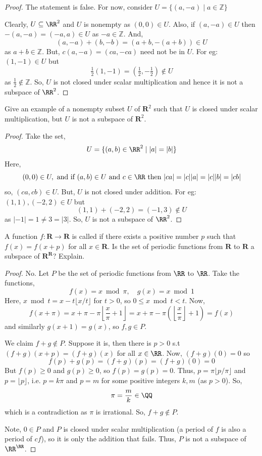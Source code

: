 \begin{proof}
The statement is false. For now, consider $U = \{(a, -a) \mid a \in \mathbb{Z}\}$

Clearly, $U \subseteq \RR^2$ and $U$ is nonempty as $(0,0) \in U$. Also, if $(a,-a) \in U$ then $-(a,-a) = (-a,a) \in U$ as $-a \in \mathbb{Z}$. And,
\[
(a,-a) + (b,-b) = (a+b, -(a+b)) \in U
\]
as $a + b \in \mathbb{Z}$. But, $c(a,-a) = (ca, -ca)$ need not be in $U$. For eg: $(1,-1) \in U$ but
\[
\tfrac{1}{2}(1,-1) = \left(\tfrac{1}{2}, -\tfrac{1}{2}\right) \notin U
\]
as $\tfrac{1}{2} \notin \mathbb{Z}$. So, $U$ is not closed under scalar multiplication and hence it is not a subspace of $\RR^2$.
\end{proof}

\begin{exercise}
Give an example of a nonempty subset $U$ of $\mathbf{R}^2$ such that $U$ is closed under scalar multiplication, but $U$ is not a subspace of $\mathbf{R}^2$.
\end{exercise}

\begin{proof}
Take the set,
\[
U = \{(a,b) \in \RR^2 \mid |a| = |b|\}
\]
Here,
\[
(0,0) \in U, \text{ and if } (a,b) \in U \text{ and } c \in \RR \text{ then } |ca| = |c||a| = |c||b| = |cb|
\]
so, $(ca, cb) \in U$. But, $U$ is not closed under addition. For eg: $(1,1), (-2,2) \in U$ but
\[
(1,1) + (-2,2) = (-1,3) \notin U
\]
as $|-1| = 1 \neq 3 = |3|$. So, $U$ is not a subspace of $\RR^2$.
\end{proof}

\begin{exercise}
A function $f \colon \mathbf{R} \to \mathbf{R}$ is called  if there exists a positive number $p$ such that $f(x) = f(x + p)$ for all $x \in \mathbf{R}$. Is the set of periodic functions from $\mathbf{R}$ to $\mathbf{R}$ a subspace of $\mathbf{R}^{\mathbf{R}}$? Explain.
\end{exercise}

\begin{proof}
No. Let $P$ be the set of periodic functions from $\RR$ to $\RR$. Take the functions,
\[
f(x) = x \bmod \pi, \quad g(x) = x \bmod 1
\]
Here, $x \bmod t = x - t\lfloor x/t \rfloor$ for $t > 0$, so $0 \le x \bmod t < t$. Now,
\[
f(x + \pi) = x + \pi - \pi\left\lfloor \frac{x}{\pi} + 1 \right\rfloor = x + \pi - \pi\left(\left\lfloor \frac{x}{\pi} \right\rfloor + 1\right) = f(x)
\]
and similarly $g(x+1) = g(x)$, so $f, g \in P$.

We claim $f + g \notin P$. Suppose it is, then there is $p > 0$ s.t $(f+g)(x+p) = (f+g)(x)$ for all $x \in \RR$. Now, $(f+g)(0) = 0$ so
\[
f(p) + g(p) = (f+g)(p) = (f+g)(0) = 0
\]
But $f(p) \ge 0$ and $g(p) \ge 0$, so $f(p) = g(p) = 0$. Thus, $p = \pi \lfloor p/\pi \rfloor$ and $p = \lfloor p \rfloor$, i.e. $p = k\pi$ and $p = m$ for some positive integers $k, m$ (as $p > 0$). So,
\[
\pi = \frac{m}{k} \in \QQ
\]
which is a contradiction as $\pi$ is irrational. So, $f + g \notin P$.

Note, $0 \in P$ and $P$ is closed under scalar multiplication (a period of $f$ is also a period of $cf$), so it is only the addition that fails. Thus, $P$ is not a subspace of $\RR^{\RR}$.
\end{proof}

